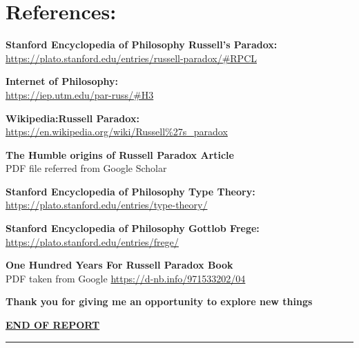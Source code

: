 \documentclass[a4paper]{article}
\begin{document}
\section{References:}
\textbf{Stanford Encyclopedia of Philosophy Russell's Paradox:}\\ 
\url{https://plato.stanford.edu/entries/russell-paradox/#RPCL}
\par \null \par
\noindent \textbf{Internet of Philosophy:} \\
\url{https://iep.utm.edu/par-russ/#H3}
\par \null \par
\noindent \textbf{Wikipedia:Russell Paradox:} \\
\url{https://en.wikipedia.org/wiki/Russell%27s_paradox}
\par \null \par
\noindent \textbf{The Humble origins of Russell Paradox Article} \\
PDF file referred from Google Scholar 
\par \null \par
\noindent \textbf{Stanford Encyclopedia of Philosophy Type Theory:} \\
\url{https://plato.stanford.edu/entries/type-theory/}
\par \null \par
\noindent \textbf{Stanford Encyclopedia of Philosophy Gottlob Frege:} \\
\url{https://plato.stanford.edu/entries/frege/}
\par \null \par
\noindent \textbf{One Hundred Years For Russell Paradox Book} \\
PDF taken from Google \url{https://d-nb.info/971533202/04} 
\par \null \par

\par \null \par
\par \null \par

\textbf{Thank you for giving me an opportunity to explore new things}
\par \null \par
\textbf{\underline{END OF REPORT}}
\par \null \par
\par \null \par
\hrule
\end{document}
